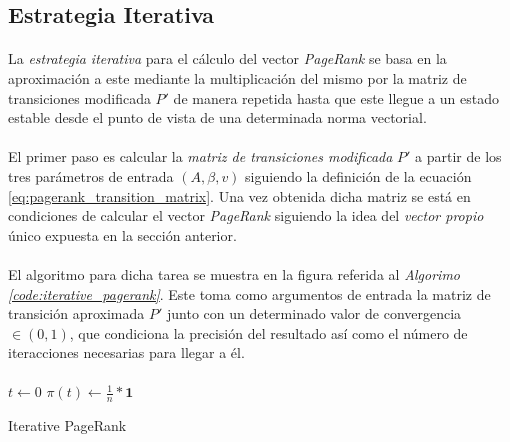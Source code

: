 \documentclass{subfiles}
\begin{document}
      \subsection{Estrategia Iterativa}
      \label{sec:pagerank_algorithm_iterative}

        \paragraph{}
        La \emph{estrategia iterativa} para el cálculo del vector \emph{PageRank} se basa en la aproximación a este mediante la multiplicación del mismo por la matriz de transiciones modificada $P'$ de manera repetida hasta que este llegue a un estado estable desde el punto de vista de una determinada norma vectorial.

        \paragraph{}
        El primer paso es calcular la \emph{matriz de transiciones modificada} $P'$ a partir de los tres parámetros de entrada $(A, \beta, v)$  siguiendo la definición de la ecuación \eqref{eq:pagerank_transition_matrix}. Una vez obtenida dicha matriz se está en condiciones de calcular el vector \emph{PageRank} siguiendo la idea del \emph{vector propio} único expuesta en la sección anterior.

        \paragraph{}
        El algoritmo para dicha tarea se muestra en la figura referida al \emph{Algorimo \ref{code:iterative_pagerank}}. Este toma como argumentos de entrada la matriz de transición aproximada $P'$ junto con un determinado valor de convergencia $\in (0,1)$, que condiciona la precisión del resultado así como el número de iteracciones necesarias para llegar a él.

        \paragraph{}
        \begin{algorithm}
          \SetAlgoLined
          $t \gets 0$\;
          $\pi(t) \gets \frac{1}{n}*\boldsymbol{1}$\;
          \caption{Iterative PageRank}
          \label{code:iterative_pagerank}
        \end{algorithm}
\end{document}
